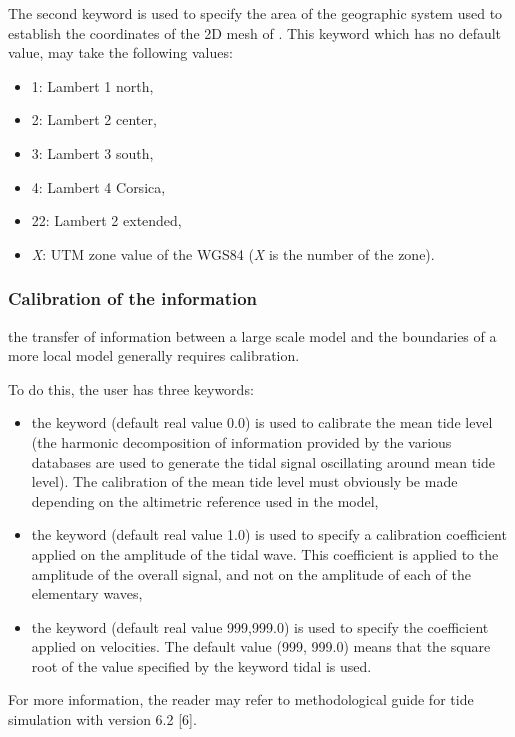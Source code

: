 The second keyword is used to specify the area of the geographic system used to
establish the coordinates of the 2D mesh of . This keyword
 which has no default value, may take
the following values:

\begin{itemize}
\item 1: Lambert 1 north,

\item 2: Lambert 2 center,

\item 3: Lambert 3 south,

\item 4: Lambert 4 Corsica,

\item 22: Lambert 2 extended,

\item \textit{X}: UTM zone value of the WGS84 (\textit{X} is the number of the
zone).
\end{itemize}


\subsubsection{Calibration of the information}

the transfer of information between a large scale model and the boundaries of
a more local model generally requires calibration.

To do this, the user has three keywords:

\begin{itemize}
\item the keyword  (default real
value 0.0) is used to calibrate the mean tide level (the harmonic decomposition
of information provided by the various databases are used to generate the tidal
signal oscillating around mean tide level). The calibration of the mean tide
level must obviously be made depending on the altimetric reference used in the
model,

\item the keyword  (default real
value 1.0) is used to specify a calibration coefficient applied on the
amplitude of the tidal wave. This coefficient is applied to the amplitude of
the overall signal, and not on the amplitude of each of the elementary waves,

\item the keyword  (default
real value 999,999.0) is used to specify the coefficient applied on velocities.
The default value (999, 999.0) means that the square root of the value
specified by the keyword  tidal is
used.
\end{itemize}

For more information, the reader may refer to methodological guide for tide
simulation with version 6.2 [6].
